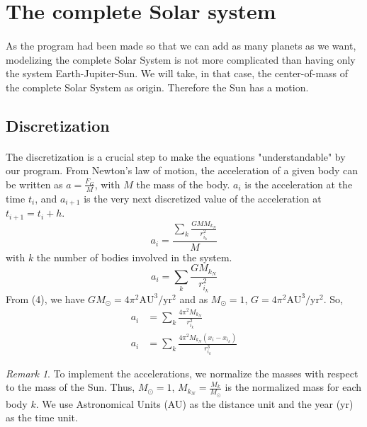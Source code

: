 \documentclass[a4paper, twoside, 11pt]{report}
\theoremstyle{theorem}
\theoremstyle{remark}
\newtheorem{remark}{Remark}[chapter]
\theoremstyle{exemple}
\begin{document}
    \section{The complete Solar system}
        \paragraph{}As the program had been made so that we can add as many planets as we want, modelizing the complete Solar System is not more complicated than having only the system Earth-Jupiter-Sun. We will take, in that case, the center-of-mass of the complete Solar System as origin. Therefore the Sun has a motion.
        

    \subsection{Discretization}
    
    \paragraph{}The discretization is a crucial step to make the equations "understandable" by our program. From Newton's law of motion, the acceleration of a given body can be written as $a=\frac{F_G}{M}$, with $M$ the mass of the body. $a_i$ is the acceleration at the time $t_i$, and ${a}_{i+1}$ is the very next discretized value of the acceleration at ${t}_{i+1}={t}_{i}+h$.
                \begin{equation*}
                    a_i = \frac{ \sum\limits_{k} \frac{GMM_{k_N}}{r_{i_k}^2}}{M}
                \end{equation*}
            with $k$ the number of bodies involved in the system. 
                \begin{equation*}
                    a_i = \sum\limits_{k} \frac{GM_{k_N}}{r_{i_k}^2}
                \end{equation*}
            From (4), we have $GM_{\odot} = 4\pi^2\mathrm{AU}^3/\mathrm{yr}^2$ and as $M_{\odot}=1$, $G=4\pi^2\mathrm{AU}^3/\mathrm{yr}^2$. So,
                \begin{align*}
                    a_i &= \sum\limits_{k} \frac{4\pi^2M_{k_N}}{r_{i_k}^2} \\
                    a_i &= \sum\limits_{k} \frac{4\pi^2M_{k_N}(x_i-x_{i_k})}{r_{i_k}^3} 
                    \tag{10}
                 \end{align*}
                 
                     \begin{remark}
    	To implement the accelerations, we normalize the masses with respect to the mass of the Sun. Thus, $M_{\odot}=1$, $M_{k_N}=\frac{M_k}{M_{\odot}}$ is the normalized mass for each body $k$. We use Astronomical Units (AU) as the distance unit and the year (yr) as the time unit.
	            \end{remark}
	
\end{document}
